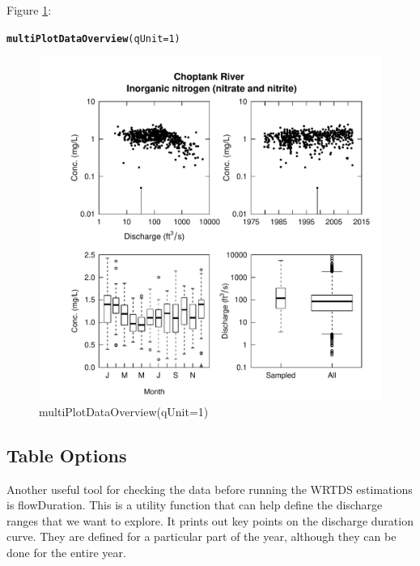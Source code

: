 \documentclass[a4paper,11pt]{article}\usepackage{graphicx, color}
\makeatletter
\newcommand{\hlfunctioncall}[1]{\textcolor[rgb]{0.501960784313725,0,0.329411764705882}{\textbf{#1}}}%
\newenvironment{kframe}{%
 \def\at@end@of@kframe{}%
 \ifinner\ifhmode%
  \def\at@end@of@kframe{\end{minipage}}%
  \begin{minipage}{\columnwidth}%
 \fi\fi%
 \def\FrameCommand##1{\hskip\@totalleftmargin \hskip-\fboxsep
 \colorbox{shadecolor}{##1}\hskip-\fboxsep
     \hskip-\linewidth \hskip-\@totalleftmargin \hskip\columnwidth}%
 \MakeFramed {\advance\hsize-\width
   \@totalleftmargin\z@ \linewidth\hsize
   \@setminipage}}%
 {\par\unskip\endMakeFramed%
 \at@end@of@kframe}
\newenvironment{knitrout}{}{} %
\makeatother
\begin{document}
Figure \ref{fig:multiPlotDataOverview}:
\begin{knitrout}
\color{fgcolor}\begin{kframe}
\begin{alltt}
\hlfunctioncall{multiPlotDataOverview}(qUnit=1)
\end{alltt}
\end{kframe}\begin{figure}[]

\includegraphics[width=1\linewidth,height=1\linewidth]{figure/multiPlotDataOverview} \caption[multiPlotDataOverview(qUnit=1)]{multiPlotDataOverview(qUnit=1)\label{fig:multiPlotDataOverview}}
\end{figure}


\end{knitrout}


\FloatBarrier

\subsection{Table Options}
\label{sec:tableOptionsWQ}
Another useful tool for checking the data before running the WRTDS estimations is flowDuration. This is a utility function that can help define the discharge ranges that we want to explore.  It prints out key points on the discharge duration curve.  They are defined for a particular part of the year, although they can be done for the entire year.  
\end{document}
